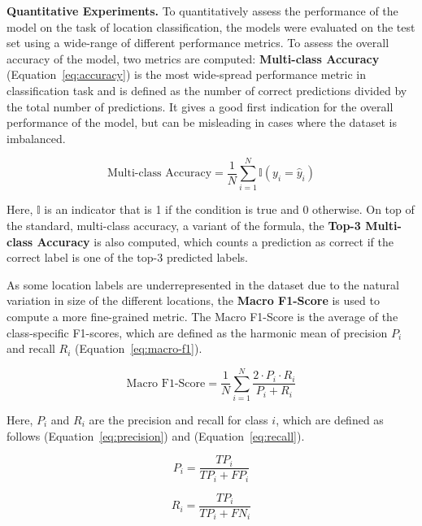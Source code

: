 \documentclass[a4paper]{article}
\begin{document}
  \textbf{Quantitative Experiments.} To quantitatively assess the performance of
  the model on the task of location classification, the models were evaluated on
  the test set using a wide-range of different performance metrics. To assess
  the overall accuracy of the model, two metrics are computed:
  \textbf{Multi-class Accuracy} (Equation~\ref{eq:accuracy}) is the most
  wide-spread performance metric in classification task and is defined as the
  number of correct predictions divided by the total number of predictions.
  It gives a good first indication for the overall performance of the model, but
  can be misleading in cases where the dataset is imbalanced.

  \begin{equation}
    \text{Multi-class Accuracy} = \frac{1}{N} \sum_{i=1}^{N} \mathbb{I}(y_i =
    \hat{y}_i) 
    \label{eq:accuracy}
  \end{equation}

  Here, $\mathbb{I}$ is an indicator that is 1 if the condition is true and 0
  otherwise. On top of the standard, multi-class accuracy, a variant of the
  formula, the \textbf{Top-3 Multi-class Accuracy} is also computed, which
  counts a prediction as correct if the correct label is one of the top-3
  predicted labels.

  As some location labels are underrepresented in the dataset due to the natural
  variation in size of the different locations, the \textbf{Macro F1-Score} is
  used to compute a more fine-grained metric. The Macro F1-Score is the average
  of the class-specific F1-scores, which are defined as the harmonic mean of
  precision $P_i$ and recall $R_i$ (Equation~\ref{eq:macro-f1}).

  \begin{equation}
    \text{Macro F1-Score} = \frac{1}{N} \sum_{i=1}^{N} \frac{2 \cdot P_i \cdot 
    R_i}{P_i + R_i}
    \label{eq:macro-f1}
  \end{equation}

  Here, $P_i$ and $R_i$ are the precision and recall for class $i$, which are 
  defined as follows (Equation~\ref{eq:precision}) and (Equation~\ref{eq:recall}).

  \begin{equation}
    P_i = \frac{TP_i}{TP_i + FP_i}
    \label{eq:precision}
  \end{equation}

  \begin{equation}
    R_i = \frac{TP_i}{TP_i + FN_i}
    \label{eq:recall}
  \end{equation}
\end{document}
